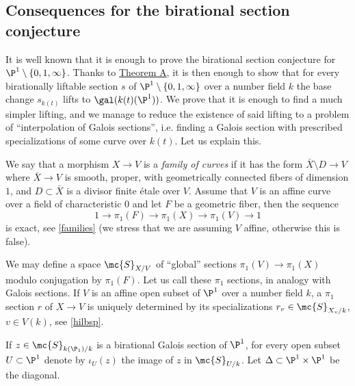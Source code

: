 \subsection{Consequences for the birational section conjecture}

It is well known that it is enough to prove the birational section conjecture for $\P^{1}\setminus\{0,1,\infty\}$. Thanks to \hyperlink{TA}{Theorem A}, it is then enough to show that for every birationally liftable section $s$ of $\P^{1}\setminus\{0,1,\infty\}$ over a number field $k$ the base change $s_{k(t)}$ lifts to $\gal(k(t)(\P^{1}))$. We prove that it is enough to find a much simpler lifting, and we manage to reduce the existence of said lifting to a problem of ``interpolation of Galois sections'', i.e. finding a Galois section with prescribed specializations of some curve over $k(t)$. Let us explain this.

We say that a morphism $X\to V$ is a \emph{family of curves} if it has the form $\bar{X}\setminus D\to V$ where $\bar{X}\to V$ is smooth, proper, with geometrically connected fibers of dimension $1$, and $D\subset\bar{X}$ is a divisor finite étale over $V$. Assume that $V$ is an affine curve over a field of characteristic $0$ and let $F$ be a geometric fiber, then the sequence
\[1 \to \pi_{1}(F)\to\pi_{1}(X)\to\pi_{1}(V)\to 1\]
is exact, see \autoref{families} (we stress that we are assuming $V$ affine, otherwise this is false).

We may define a space $\mc{S}_{X/V}$ of ``global'' sections $\pi_{1}(V)\to\pi_{1}(X)$ modulo conjugation by $\pi_{1}(F)$. Let us call these $\pi_{1}$ sections, in analogy with Galois sections. If $V$ is an affine open subset of $\P^{1}$ over a number field $k$, a $\pi_{1}$ section $r$ of $X\to V$ is uniquely determined by its specializations $r_{v}\in\mc{S}_{X_{v}/k}$, $v\in V(k)$, see \autoref{hilbsp}.

If $z\in\mc{S}_{k(\P_{1})/k}$ is a birational Galois section of $\P^{1}$, for every open subset $U\subset\P^{1}$ denote by $\iota_{U}(z)$ the image of $z$ in $\mc{S}_{U/k}$. Let $\Delta\subset\P^{1}\times\P^{1}$ be the diagonal.


